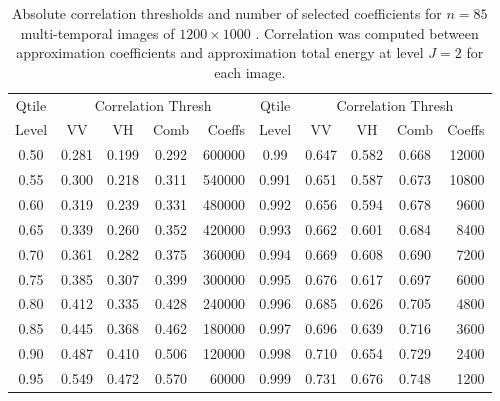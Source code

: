 \documentclass[journal]{IEEEtran}
\begin{document}
\begin{table}[ht!]
\caption{Absolute correlation thresholds and number of selected coefficients for $n=85$ multi-temporal images of $1200\times 1000$ . Correlation was computed between approximation coefficients and approximation total energy at level $J=2$ for each image. }\label{tabela_quantis}
\centering
\begin{tabular}{c|cccr||c|cccr}
\hline
Qtile &\multicolumn{4}{c||}{\sc Correlation Thresh} &Qtile & \multicolumn{4}{c}{\sc Correlation Thresh}  \\
Level &VV&VH&Comb& Coeffs &Level &VV&VH&Comb& Coeffs \\
\hline
0.50&0.281&0.199&0.292&600000&0.99&0.647&0.582&0.668&12000\\
0.55&0.300&0.218&0.311&540000&0.991&0.651&0.587&0.673&10800\\
0.60&0.319&0.239&0.331&480000& 0.992&0.656&0.594&0.678&9600\\
0.65&0.339&0.260&0.352&420000& 0.993&0.662&0.601&0.684&8400\\
0.70&0.361&0.282&0.375&360000& 0.994&0.669&0.608&0.690&7200\\
0.75&0.385&0.307&0.399&300000& 0.995&0.676&0.617&0.697&6000\\
0.80&0.412&0.335&0.428&240000& 0.996&0.685&0.626&0.705&4800\\
0.85&0.445&0.368&0.462&180000& 0.997&0.696&0.639&0.716&3600\\
0.90&0.487&0.410&0.506&120000& 0.998&0.710&0.654&0.729&2400\\
0.95&0.549&0.472&0.570&60000& 0.999&0.731&0.676&0.748&1200\\
\hline
\end{tabular}
\end{table}
\end{document}
